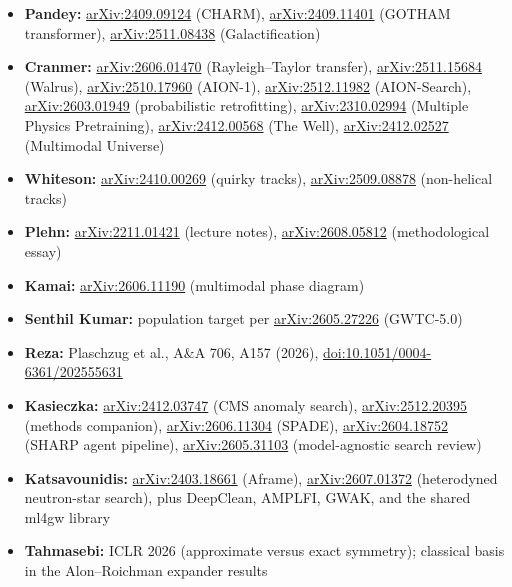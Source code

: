 \documentclass[11pt]{article}
\begin{document}
\begin{itemize}[leftmargin=*]
    \item \textbf{Pandey:} \href{https://arxiv.org/abs/2409.09124}{arXiv:2409.09124} (CHARM), \href{https://arxiv.org/abs/2409.11401}{arXiv:2409.11401} (GOTHAM transformer), \href{https://arxiv.org/abs/2511.08438}{arXiv:2511.08438} (Galactification)
    \item \textbf{Cranmer:} \href{https://arxiv.org/abs/2606.01470}{arXiv:2606.01470} (Rayleigh--Taylor transfer), \href{https://arxiv.org/abs/2511.15684}{arXiv:2511.15684} (Walrus), \href{https://arxiv.org/abs/2510.17960}{arXiv:2510.17960} (AION-1), \href{https://arxiv.org/abs/2512.11982}{arXiv:2512.11982} (AION-Search), \href{https://arxiv.org/abs/2603.01949}{arXiv:2603.01949} (probabilistic retrofitting), \href{https://arxiv.org/abs/2310.02994}{arXiv:2310.02994} (Multiple Physics Pretraining), \href{https://arxiv.org/abs/2412.00568}{arXiv:2412.00568} (The Well), \href{https://arxiv.org/abs/2412.02527}{arXiv:2412.02527} (Multimodal Universe)
    \item \textbf{Whiteson:} \href{https://arxiv.org/abs/2410.00269}{arXiv:2410.00269} (quirky tracks), \href{https://arxiv.org/abs/2509.08878}{arXiv:2509.08878} (non-helical tracks)
    \item \textbf{Plehn:} \href{https://arxiv.org/abs/2211.01421}{arXiv:2211.01421} (lecture notes), \href{https://arxiv.org/abs/2608.05812}{arXiv:2608.05812} (methodological essay)
    \item \textbf{Kamai:} \href{https://arxiv.org/abs/2606.11190}{arXiv:2606.11190} (multimodal phase diagram)
    \item \textbf{Senthil Kumar:} population target per \href{https://arxiv.org/abs/2605.27226}{arXiv:2605.27226} (GWTC-5.0)
    \item \textbf{Reza:} Plaschzug et al., A\&A 706, A157 (2026), \href{https://doi.org/10.1051/0004-6361/202555631}{doi:10.1051/0004-6361/202555631}
    \item \textbf{Kasieczka:} \href{https://arxiv.org/abs/2412.03747}{arXiv:2412.03747} (CMS anomaly search), \href{https://arxiv.org/abs/2512.20395}{arXiv:2512.20395} (methods companion), \href{https://arxiv.org/abs/2606.11304}{arXiv:2606.11304} (SPADE), \href{https://arxiv.org/abs/2604.18752}{arXiv:2604.18752} (SHARP agent pipeline), \href{https://arxiv.org/abs/2605.31103}{arXiv:2605.31103} (model-agnostic search review)
    \item \textbf{Katsavounidis:} \href{https://arxiv.org/abs/2403.18661}{arXiv:2403.18661} (Aframe), \href{https://arxiv.org/abs/2607.01372}{arXiv:2607.01372} (heterodyned neutron-star search), plus DeepClean, AMPLFI, GWAK, and the shared ml4gw library
    \item \textbf{Tahmasebi:} ICLR 2026 (approximate versus exact symmetry); classical basis in the Alon--Roichman expander results
\end{itemize}
\end{document}
